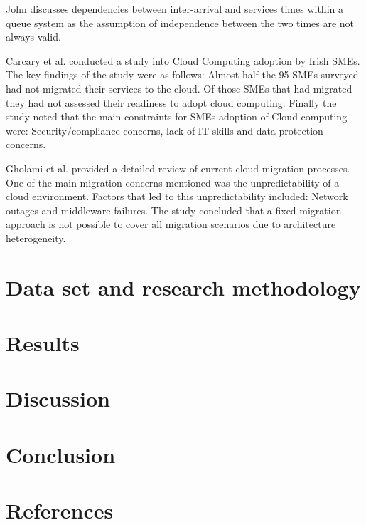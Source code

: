 \documentclass[5p]{elsarticle}
\begin{document}
John \cite{john1963single} discusses dependencies between inter-arrival and services times within a queue system as the assumption of independence between the two times are not always valid. \par

Carcary et al. \cite{carcary2014adoption} conducted a study into Cloud Computing adoption by Irish SMEs. The key findings of the study were as follows: Almost half the 95 SMEs surveyed had not migrated their services to the cloud. Of those SMEs that had migrated they had not assessed their readiness to adopt cloud computing. Finally the study noted that the main constraints for SMEs adoption of Cloud computing were: Security/compliance concerns, lack of IT skills and data protection concerns. \par

Gholami et al. \cite{gholami2016cloud} provided a detailed review of current cloud migration processes. One of the main migration concerns mentioned was the unpredictability of a cloud environment. Factors that led to this unpredictability included: Network outages and middleware failures. The study concluded that a fixed migration approach is not possible to cover all migration scenarios due to architecture heterogeneity. 








\section{Data set and research methodology}


\section{Results}


\section{Discussion}


\section{Conclusion}


\section*{References}


\end{document}
